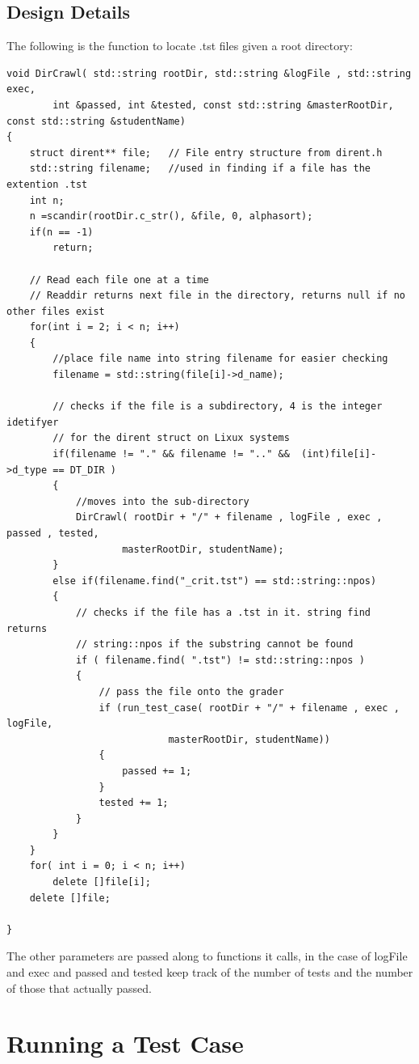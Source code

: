 \subsection{Design Details}
The following is the function to locate .tst files given a root directory:
\begin{lstlisting}
void DirCrawl( std::string rootDir, std::string &logFile , std::string exec,
        int &passed, int &tested, const std::string &masterRootDir, const std::string &studentName)
{
    struct dirent** file;	// File entry structure from dirent.h
    std::string filename;	//used in finding if a file has the extention .tst
    int n;
    n =scandir(rootDir.c_str(), &file, 0, alphasort);
    if(n == -1)
        return;

    // Read each file one at a time
    // Readdir returns next file in the directory, returns null if no other files exist
    for(int i = 2; i < n; i++)
    {
        //place file name into string filename for easier checking
        filename = std::string(file[i]->d_name);

        // checks if the file is a subdirectory, 4 is the integer idetifyer
        // for the dirent struct on Lixux systems
        if(filename != "." && filename != ".." &&  (int)file[i]->d_type == DT_DIR )
        {
            //moves into the sub-directory
            DirCrawl( rootDir + "/" + filename , logFile , exec , passed , tested,
                    masterRootDir, studentName);
        }
        else if(filename.find("_crit.tst") == std::string::npos)
        {
            // checks if the file has a .tst in it. string find returns
            // string::npos if the substring cannot be found
            if ( filename.find( ".tst") != std::string::npos )
            {
                // pass the file onto the grader 
                if (run_test_case( rootDir + "/" + filename , exec , logFile,
                            masterRootDir, studentName))
                {
                    passed += 1;
                }
                tested += 1;
            }
        }
    }
    for( int i = 0; i < n; i++)
        delete []file[i];
    delete []file;

}
\end{lstlisting}
The other parameters are passed along to functions it calls, in the case of logFile and exec and passed and tested 
keep track of the number of tests and the number of those that actually passed.


\section{Running a Test Case }

